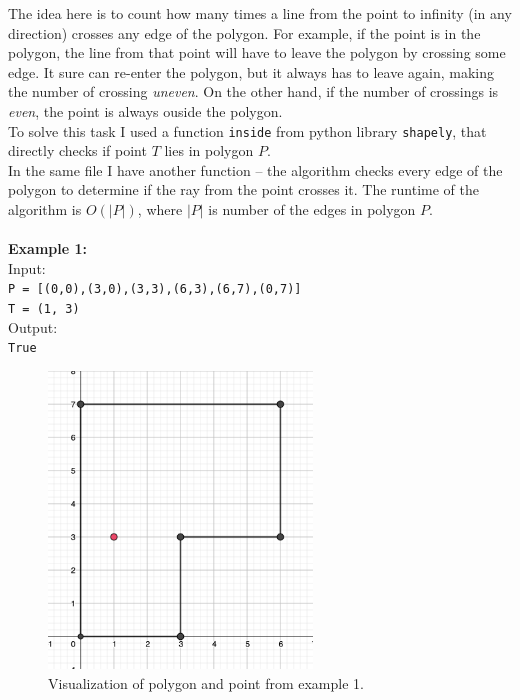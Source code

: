 \documentclass[a4paper,11pt]{article}
\begin{document}
\noindent
The idea here is to count how many times a line from the point to infinity (in any direction) crosses any edge of the polygon. For example, if the point is in the polygon, the line from that point will have to leave the polygon by crossing some edge.
It sure can re-enter the polygon, but it always has to leave again, making the number of crossing \textit{uneven}. On the other hand, if the number of crossings is \textit{even}, the point is always ouside the polygon.
\\
To solve this task I used a function \texttt{inside} from python library \texttt{shapely}, that directly checks if point $T$ lies in polygon $P$. 
\\
In the same file I have another function  -- the algorithm checks every edge of the polygon to determine if the ray from the point crosses it. The runtime of the algorithm is $O(|P |)$, where $|P |$ is number of the edges in polygon $P$.
\\
\\
\noindent
\textbf{Example 1:} \\
Input: \\
\texttt{P = [(0,0),(3,0),(3,3),(6,3),(6,7),(0,7)]}
\\
\texttt{T = (1, 3)}
\\
Output: \\
\texttt{True}
\begin{figure}[ht!]
    \centering
    \includegraphics[width=70mm]{j1.png}
    \caption{Visualization of polygon and point from example 1.}
\end{figure}
\end{document}
